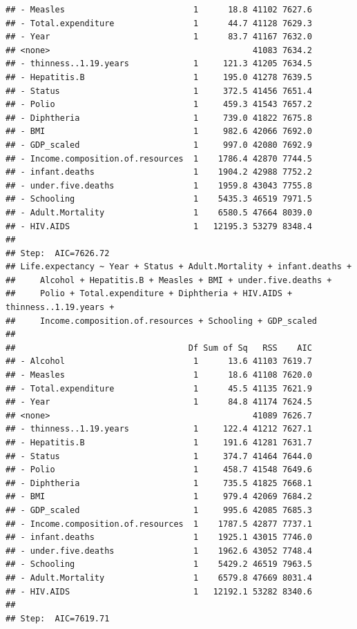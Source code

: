\documentclass[
]{article}
\begin{document}
\begin{verbatim}
## - Measles                          1      18.8 41102 7627.6
## - Total.expenditure                1      44.7 41128 7629.3
## - Year                             1      83.7 41167 7632.0
## <none>                                         41083 7634.2
## - thinness..1.19.years             1     121.3 41205 7634.5
## - Hepatitis.B                      1     195.0 41278 7639.5
## - Status                           1     372.5 41456 7651.4
## - Polio                            1     459.3 41543 7657.2
## - Diphtheria                       1     739.0 41822 7675.8
## - BMI                              1     982.6 42066 7692.0
## - GDP_scaled                       1     997.0 42080 7692.9
## - Income.composition.of.resources  1    1786.4 42870 7744.5
## - infant.deaths                    1    1904.2 42988 7752.2
## - under.five.deaths                1    1959.8 43043 7755.8
## - Schooling                        1    5435.3 46519 7971.5
## - Adult.Mortality                  1    6580.5 47664 8039.0
## - HIV.AIDS                         1   12195.3 53279 8348.4
## 
## Step:  AIC=7626.72
## Life.expectancy ~ Year + Status + Adult.Mortality + infant.deaths + 
##     Alcohol + Hepatitis.B + Measles + BMI + under.five.deaths + 
##     Polio + Total.expenditure + Diphtheria + HIV.AIDS + thinness..1.19.years + 
##     Income.composition.of.resources + Schooling + GDP_scaled
## 
##                                   Df Sum of Sq   RSS    AIC
## - Alcohol                          1      13.6 41103 7619.7
## - Measles                          1      18.6 41108 7620.0
## - Total.expenditure                1      45.5 41135 7621.9
## - Year                             1      84.8 41174 7624.5
## <none>                                         41089 7626.7
## - thinness..1.19.years             1     122.4 41212 7627.1
## - Hepatitis.B                      1     191.6 41281 7631.7
## - Status                           1     374.7 41464 7644.0
## - Polio                            1     458.7 41548 7649.6
## - Diphtheria                       1     735.5 41825 7668.1
## - BMI                              1     979.4 42069 7684.2
## - GDP_scaled                       1     995.6 42085 7685.3
## - Income.composition.of.resources  1    1787.5 42877 7737.1
## - infant.deaths                    1    1925.1 43015 7746.0
## - under.five.deaths                1    1962.6 43052 7748.4
## - Schooling                        1    5429.2 46519 7963.5
## - Adult.Mortality                  1    6579.8 47669 8031.4
## - HIV.AIDS                         1   12192.1 53282 8340.6
## 
## Step:  AIC=7619.71

\end{verbatim}
\end{document}
